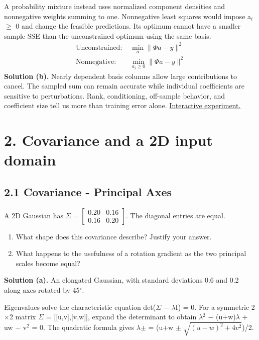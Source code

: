 \documentclass[11pt,a4paper]{article}
\begin{document}
A probability mixture instead uses normalized component densities and nonnegative weights summing to one.
Nonnegative least squares would impose a${}_i$ $\ge$ 0 and change the feasible predictions.
Its optimum cannot have a smaller sample SSE than the unconstrained optimum using the same basis.
\[
\begin{aligned}\text{Unconstrained: }&\min_a\|\Phi a-y\|^2\\\text{Nonnegative: }&\min_{a_i\ge0}\|\Phi a-y\|^2\end{aligned}
\]
\noindent\textbf{Solution (b).} Nearly dependent basis columns allow large contributions to cancel.
The sampled sum can remain accurate while individual coefficients are sensitive to perturbations.
Rank, conditioning, off-sample behavior, and coefficient size tell us more than training error alone.
\noindent\href{https://sosekie.github.io/Unibe-CVG-CV-Interactive-Labs/tutorial-09/#mixture}{Interactive experiment.}
\par{}\section*{2. Covariance and a 2D input domain}
\subsection*{2.1 Covariance - Principal Axes}
A 2D Gaussian has $\Sigma=\begin{bmatrix}0.20&0.16\\0.16&0.20\end{bmatrix}$.
The diagonal entries are equal.
\begin{enumerate}[label=(\alph*),nosep]
\item What shape does this covariance describe?
Justify your answer.
\item What happens to the usefulness of a rotation gradient as the two principal scales become equal?
\end{enumerate}
\noindent\textbf{Solution (a).} An elongated Gaussian, with standard deviations 0.6 and 0.2 along axes rotated by 45${}^\circ$.

Eigenvalues solve the characteristic equation det($\Sigma$ $-$ $\lambda$I) = 0.
For a symmetric 2$\times$2 matrix $\Sigma$ = [[u,v],[v,w]], expand the determinant to obtain $\lambda$${}^2$ $-$ (u+w)$\lambda$ + uw $-$ v${}^2$ = 0.
The quadratic formula gives $\lambda$$\pm$ = (u+w $\pm$ $\sqrt{(u-w)^2+4v^2}$)/2.
\end{document}
